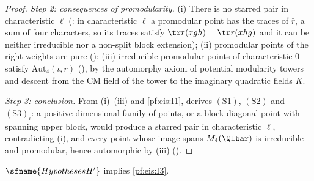 \begin{proof}
\emph{Step 2: consequences of promodularity.} (i) There is no starred pair in characteristic $\ell$
(: in characteristic $\ell$ a promodular point has the traces of $\bar r$, a sum of four
characters, so its traces satisfy $\tr r(xgh)=\tr r(xhg)$ and it can be neither irreducible nor a non-split block extension); (ii) promodular points of the right weights are pure
(); (iii) irreducible promodular points of characteristic $0$ satisfy
$\mathrm{Aut}_4(\iota,r)$ (), by the automorphy axiom of potential modularity towers and descent from
the CM field of the tower to the imaginary quadratic fields $K$.

\emph{Step 3: conclusion.} From (i)--(iii) and \ref{pf:eis:I1},  derives
$(\mathrm{S1})$, $(\mathrm{S2})$ and $(\mathrm{S3})_\iota$: a positive-dimensional family of points, or a block-diagonal point with spanning upper block,
would produce a starred pair in characteristic $\ell$, contradicting (i), and every point whose image spans $M_4(\Qlbar)$ is irreducible and
promodular, hence automorphic by (iii) ().
\end{proof}

\begin{theorem}\label{pf:eis:seedII}
$\sfname{HypothesesH'}$ implies \ref{pf:eis:I3}.
\end{theorem}

